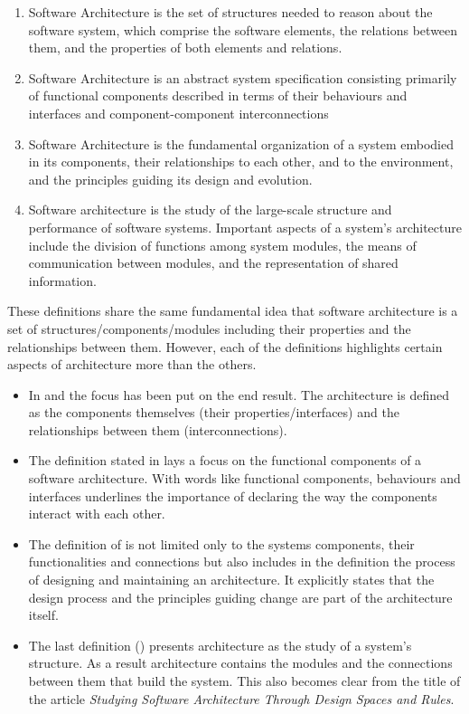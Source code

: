 \documentclass{article}
\begin{document}
\begin{enumerate}
\item Software Architecture is the set of structures needed to reason about the software system, which comprise the software elements, the relations between them, and the properties of both elements and relations.\cite{clemens}

\item Software Architecture is an abstract system specification consisting primarily of functional components described in terms of their behaviours and interfaces and component-component interconnections\cite{hayesroth}

\item Software Architecture is the fundamental organization of a system embodied in its components, their relationships to each other, and to the environment, and the principles guiding its design and evolution.\cite{IEEE1471}

\item Software architecture is the study of the large-scale structure and performance of software systems. Important aspects of a system's architecture include the division of functions among system modules, the means of communication between modules, and the representation of shared information.\cite{lane90}

\end{enumerate}

These definitions share the same fundamental idea that software architecture
is a set of structures/components/modules including their properties and the
relationships between them. However, each of the definitions highlights certain
aspects of architecture more than the others. 
\begin{itemize}
\item In \cite{clemens} and \cite{hayesroth} the focus has been put on the end result. The architecture 
is defined as the components themselves (their properties/interfaces) and the relationships between them (interconnections).
\item The definition stated in \cite{hayesroth} lays a focus on the functional components of a software architecture. With words like functional components, 
behaviours and interfaces underlines the importance of declaring the way the components interact with each other.
\item The definition of \cite{IEEE1471} is not limited only to the systems components, their functionalities and connections but also includes in the definition the 
process of designing and maintaining an architecture. It explicitly states that the design process and the principles guiding change are part of the architecture itself.
\item The last definition (\cite{lane90}) presents architecture as the study of a system's structure. As a result architecture contains the modules and the connections between them that build the system. This also becomes clear
from the title of the article \emph{Studying Software Architecture Through Design Spaces and Rules}.

\end{itemize}
\end{document}
